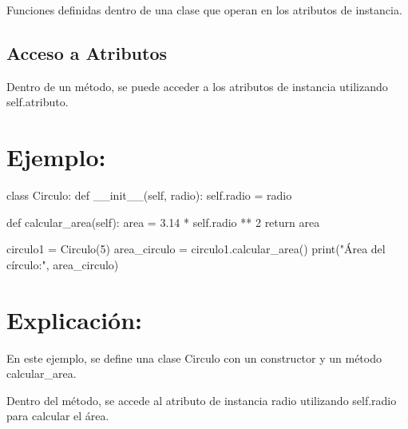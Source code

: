 \documentclass[
  a4paper,
  onepage,
  openany]{scrreprt}
\newenvironment{Shaded}{\begin{snugshade}}{\end{snugshade}}
\newcommand{\BuiltInTok}[1]{\textcolor[rgb]{0.00,0.23,0.31}{#1}}
\newcommand{\ControlFlowTok}[1]{\textcolor[rgb]{0.00,0.23,0.31}{#1}}
\newcommand{\DecValTok}[1]{\textcolor[rgb]{0.68,0.00,0.00}{#1}}
\newcommand{\FloatTok}[1]{\textcolor[rgb]{0.68,0.00,0.00}{#1}}
\newcommand{\FunctionTok}[1]{\textcolor[rgb]{0.28,0.35,0.67}{#1}}
\newcommand{\KeywordTok}[1]{\textcolor[rgb]{0.00,0.23,0.31}{#1}}
\newcommand{\NormalTok}[1]{\textcolor[rgb]{0.00,0.23,0.31}{#1}}
\newcommand{\OperatorTok}[1]{\textcolor[rgb]{0.37,0.37,0.37}{#1}}
\newcommand{\StringTok}[1]{\textcolor[rgb]{0.13,0.47,0.30}{#1}}
\newcommand{\VariableTok}[1]{\textcolor[rgb]{0.07,0.07,0.07}{#1}}
\begin{document}
Funciones definidas dentro de una clase que operan en los atributos de
instancia.

\hypertarget{acceso-a-atributos}{%
\subsection{Acceso a Atributos}\label{acceso-a-atributos}}

Dentro de un método, se puede acceder a los atributos de instancia
utilizando self.atributo.

\hypertarget{ejemplo-52}{%
\section{Ejemplo:}\label{ejemplo-52}}

\begin{Shaded}
\begin{Highlighting}[]
\KeywordTok{class}\NormalTok{ Circulo:}
    \KeywordTok{def} \FunctionTok{\_\_init\_\_}\NormalTok{(}\VariableTok{self}\NormalTok{, radio):}
        \VariableTok{self}\NormalTok{.radio }\OperatorTok{=}\NormalTok{ radio}

    \KeywordTok{def}\NormalTok{ calcular\_area(}\VariableTok{self}\NormalTok{):}
\NormalTok{        area }\OperatorTok{=} \FloatTok{3.14} \OperatorTok{*} \VariableTok{self}\NormalTok{.radio }\OperatorTok{**} \DecValTok{2}
        \ControlFlowTok{return}\NormalTok{ area}

\NormalTok{circulo1 }\OperatorTok{=}\NormalTok{ Circulo(}\DecValTok{5}\NormalTok{)}
\NormalTok{area\_circulo }\OperatorTok{=}\NormalTok{ circulo1.calcular\_area()}
\BuiltInTok{print}\NormalTok{(}\StringTok{"Área del círculo:"}\NormalTok{, area\_circulo)}
\end{Highlighting}
\end{Shaded}

\hypertarget{explicaciuxf3n-52}{%
\section{Explicación:}\label{explicaciuxf3n-52}}

En este ejemplo, se define una clase Circulo con un constructor y un
método calcular\_area.

Dentro del método, se accede al atributo de instancia radio utilizando
self.radio para calcular el área.
\end{document}

